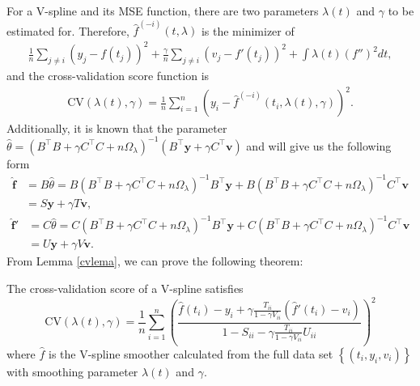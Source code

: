 For a V-spline and its MSE function, there are two parameters $\lambda(t)$ and $\gamma$ to be estimated for. Therefore, $\hat{f}^{(-i)}(t,\lambda)$ is the minimizer of  
\begin{align}
\frac{1}{n}\sum_{j \neq i}\left( y_j-f(t_j) \right)^2+\frac{\gamma}{n}\sum_{j \neq i} \left( v_j-f'(t_j) \right)^2+ \int \lambda(t) \left( f'' \right)^2dt,
\end{align}
and the cross-validation score function is
\begin{align}
\mbox{CV}\left(\lambda(t),\gamma\right)=\frac{1}{n}\sum_{i=1}^{n}\left( y_i-\hat{f}^{(-i)}\left(t_i,\lambda(t),\gamma\right) \right) ^2.
\end{align}
Additionally, it is known that the parameter $\hat{\theta}=\left(B^\top B+\gamma C^\top C+n\Omega_\lambda\right)^{-1}\left(B^\top\mathbf{y}+\gamma C^\top\mathbf{v}\right)$ and will give us the following form \small
\begin{equation}
\begin{split}
 \hat{\mathbf{f}}&=B\hat{\theta}=B\left(B^\top B+\gamma C^\top C+n\Omega_\lambda\right)^{-1}B^\top\mathbf{y}+B\left(B^\top B+\gamma C^\top C+n\Omega_\lambda\right)^{-1} C^\top\mathbf{v}\\&=S\mathbf{y}+\gamma T\mathbf{v},
 \end{split}
 \end{equation}
 \begin{equation}
 \begin{split}
\hat{\mathbf{f}}'&=C\hat{\theta}=C\left(B^\top B+\gamma C^\top C+n\Omega_\lambda\right)^{-1}B^\top\mathbf{y}+C\left(B^\top B+\gamma C^\top C+n\Omega_\lambda\right)^{-1}C^\top \mathbf{v}\\&=U\mathbf{y}+\gamma V\mathbf{v}.
 \end{split}
\end{equation}\normalsize
From Lemma \ref{cvlema}, we can prove the following theorem: 
\begin{theorem}\label{tractorsplinecvscore}
The cross-validation score of a V-spline satisfies
\begin{equation}\label{tractorcv}
\mbox{CV}\left(\lambda(t),\gamma\right)=\frac{1}{n}\sum_{i=1}^{n} \left( \frac{\hat{f}(t_i)-y_i+\gamma \frac{T_{ii}}{1-\gamma V_{ii}}(\hat{f}'(t_i)-v_i)}{1-S_{ii}-\gamma\frac{T_{ii}}{1-\gamma V_{ii}}U_{ii}} \right)^2
\end{equation}
where $\hat{f}$ is the V-spline smoother calculated from the full data set $\left\lbrace (t_i,y_i,v_i)\right\rbrace$ with smoothing parameter $\lambda(t)$ and $\gamma$.
\end{theorem}

